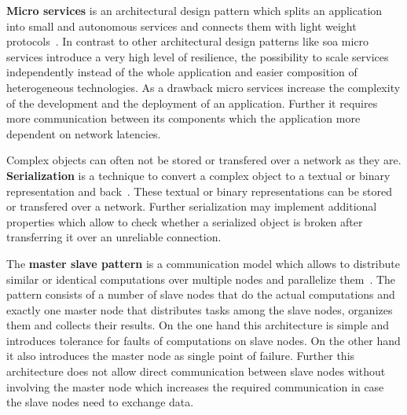 \textbf{Micro services} is an architectural design pattern which splits an application into small and autonomous services and connects them with light weight protocols~\cite{microservices}.
In contrast to other architectural design patterns like \gls{soa} micro services introduce a very high level of resilience, the possibility to scale services independently instead of the whole application and easier composition of heterogeneous technologies.
As a drawback micro services increase the complexity of the development and the deployment of an application.
Further it requires more communication between its components which the application more dependent on network latencies.\par

Complex objects can often not be stored or transfered over a network as they are.
\textbf{Serialization} is a technique to convert a complex object to a textual or binary representation and back~\cite{serialization}.
These textual or binary representations can be stored or transfered over a network.
Further serialization may implement additional properties which allow to check whether a serialized object is broken \eg{} after transferring it over an unreliable connection.\par

The \textbf{master slave pattern} is a communication model which allows to distribute similar or identical computations over multiple nodes and parallelize them~\cite{masterSlave}.
The pattern consists of a number of slave nodes that do the actual computations and exactly one master node that distributes tasks among the slave nodes, organizes them and collects their results.
On the one hand this architecture is simple and introduces tolerance for faults of computations on slave nodes.
On the other hand it also introduces the master node as single point of failure.
Further this architecture does not allow direct communication between slave nodes without involving the master node which increases the required communication in case the slave nodes need to exchange data.
